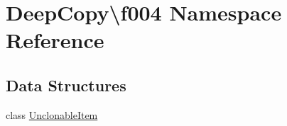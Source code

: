 \hypertarget{namespace_deep_copy_1_1f004}{}\section{Deep\+Copy\textbackslash{}f004 Namespace Reference}
\label{namespace_deep_copy_1_1f004}
\subsection*{Data Structures}
\begin{DoxyCompactItemize}
\item 
class \mbox{\hyperlink{class_deep_copy_1_1f004_1_1_unclonable_item}{Unclonable\+Item}}
\end{DoxyCompactItemize}
